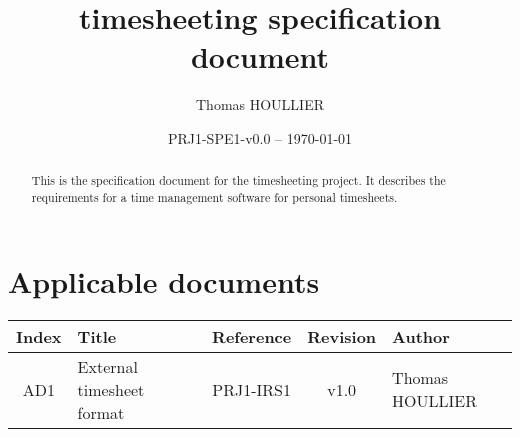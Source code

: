 \documentclass[letterpaper]{article}
\title{timesheeting specification document}
\author{Thomas HOULLIER}
\begin{document}
\frenchspacing
\date{PRJ1-SPE1-v0.0 -- \today}
\maketitle
\thispagestyle{FirstPage}

\begin{abstract}
  This is the specification document for the timesheeting project.
  It describes the requirements for a time management software for
  personal timesheets.
\end{abstract}

\begin{versionhistory}
\end{versionhistory}
\setcounter{table}{0} %

\section*{Applicable documents}
{ \centering
\begin{tabularx}{\textwidth}{| c | X | c | c | X |} \hline
  Index & Title & Reference & Revision & Author \\ \hline
  AD1   & External timesheet format & PRJ1-IRS1 & v1.0 & Thomas HOULLIER \\
\hline \end{tabularx} \par }
\tableofcontents
\printglossary[type=\acronymtype,style=index]
\pagestyle{plain}




\appendix
\cleardoublepage


\apptocmd{\thebibliography}{\raggedright}{}{}
\begingroup
{}
\setlength\bibitemsep{0pt}
\printbibliography
\endgroup
\end{document}

